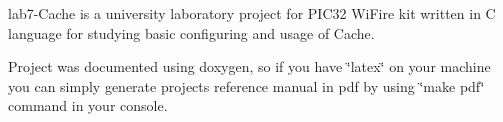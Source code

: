 lab7-\/\+Cache is a university laboratory project for P\+I\+C32 Wi\+Fire kit written in C language for studying basic configuring and usage of Cache.

Project was documented using doxygen, so if you have \char`\"{}latex\char`\"{} on your machine you can simply generate project\textquotesingle{}s reference manual in pdf by using \char`\"{}make pdf\char`\"{} command in your console. 